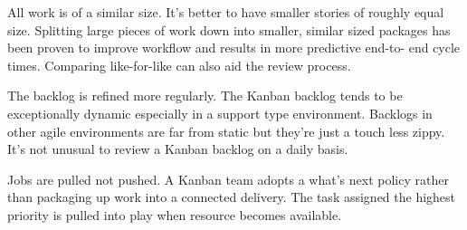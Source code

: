 All work is of a similar size. It's better to have smaller
stories of roughly equal size. Splitting large pieces of work
down into smaller, similar sized packages has been proven
to improve workflow and results in more predictive end-to-
end cycle times. Comparing like-for-like can also aid the
review process.

The backlog is refined more regularly. The Kanban
backlog tends to be exceptionally dynamic especially
in a support type environment. Backlogs in other agile
environments are far from static but they're just a touch
less zippy. It's not unusual to review a Kanban backlog on a
daily basis.

Jobs are pulled not pushed. A Kanban team adopts a
what's next policy rather than packaging up work into a
connected delivery. The task assigned the highest priority is
pulled into play when resource becomes available.

